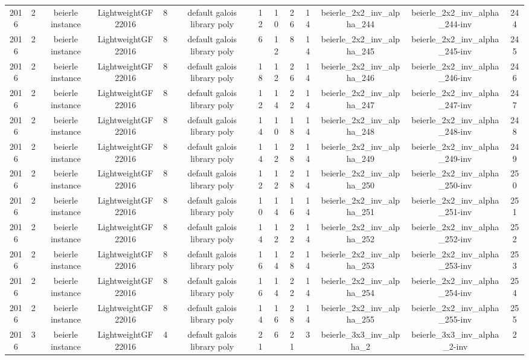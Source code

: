 \begin{tabular}{c c c c c c c c c c c c c}
2016 & 2 & beierle instance & LightweightGF22016 & 8 & default galois library poly & 12 & 10 & 26 & 14 & beierle_2x2_inv_alpha_244 & beierle_2x2_inv_alpha_244-inv & 244 \\
2016 & 2 & beierle instance & LightweightGF22016 & 8 & default galois library poly & 6 & 12 & 8 & 14 & beierle_2x2_inv_alpha_245 & beierle_2x2_inv_alpha_245-inv & 245 \\
2016 & 2 & beierle instance & LightweightGF22016 & 8 & default galois library poly & 18 & 12 & 26 & 14 & beierle_2x2_inv_alpha_246 & beierle_2x2_inv_alpha_246-inv & 246 \\
2016 & 2 & beierle instance & LightweightGF22016 & 8 & default galois library poly & 12 & 14 & 22 & 14 & beierle_2x2_inv_alpha_247 & beierle_2x2_inv_alpha_247-inv & 247 \\
2016 & 2 & beierle instance & LightweightGF22016 & 8 & default galois library poly & 14 & 10 & 18 & 14 & beierle_2x2_inv_alpha_248 & beierle_2x2_inv_alpha_248-inv & 248 \\
2016 & 2 & beierle instance & LightweightGF22016 & 8 & default galois library poly & 14 & 12 & 28 & 14 & beierle_2x2_inv_alpha_249 & beierle_2x2_inv_alpha_249-inv & 249 \\
2016 & 2 & beierle instance & LightweightGF22016 & 8 & default galois library poly & 12 & 12 & 28 & 14 & beierle_2x2_inv_alpha_250 & beierle_2x2_inv_alpha_250-inv & 250 \\
2016 & 2 & beierle instance & LightweightGF22016 & 8 & default galois library poly & 10 & 14 & 16 & 14 & beierle_2x2_inv_alpha_251 & beierle_2x2_inv_alpha_251-inv & 251 \\
2016 & 2 & beierle instance & LightweightGF22016 & 8 & default galois library poly & 14 & 12 & 22 & 14 & beierle_2x2_inv_alpha_252 & beierle_2x2_inv_alpha_252-inv & 252 \\
2016 & 2 & beierle instance & LightweightGF22016 & 8 & default galois library poly & 16 & 14 & 28 & 14 & beierle_2x2_inv_alpha_253 & beierle_2x2_inv_alpha_253-inv & 253 \\
2016 & 2 & beierle instance & LightweightGF22016 & 8 & default galois library poly & 16 & 14 & 22 & 14 & beierle_2x2_inv_alpha_254 & beierle_2x2_inv_alpha_254-inv & 254 \\
2016 & 2 & beierle instance & LightweightGF22016 & 8 & default galois library poly & 14 & 16 & 28 & 14 & beierle_2x2_inv_alpha_255 & beierle_2x2_inv_alpha_255-inv & 255 \\
2016 & 3 & beierle instance & LightweightGF22016 & 4 & default galois library poly & 21 & 6 & 21 & 3 & beierle_3x3_inv_alpha_2 & beierle_3x3_inv_alpha_2-inv & 2 \\

\end{tabular}
